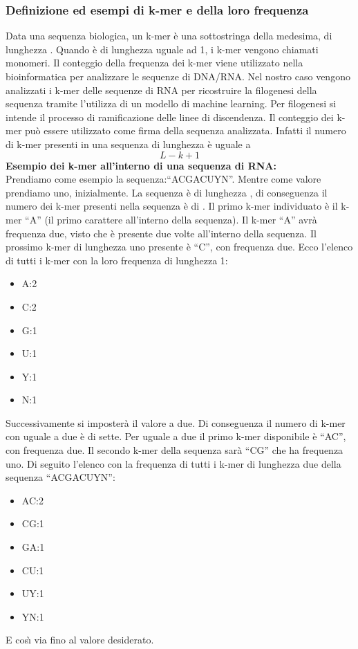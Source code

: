     \subsubsection{Definizione ed esempi di k-mer e della loro frequenza}
    Data una sequenza biologica, un k-mer \`e una sottostringa della medesima, di lunghezza \klenght.
    Quando \klenght \`e di lunghezza uguale ad 1, i k-mer vengono chiamati monomeri.
    Il conteggio della frequenza dei k-mer viene utilizzato nella bioinformatica per analizzare le sequenze di DNA/RNA.
    Nel nostro caso vengono analizzati i k-mer delle sequenze di RNA per ricostruire la filogenesi della sequenza
    tramite l'utilizza di un modello di machine learning.
    Per filogenesi si intende il processo di ramificazione delle linee di discendenza.
    Il conteggio dei k-mer pu\`o essere utilizzato come firma della sequenza analizzata. Infatti
    il numero di k-mer presenti in una sequenza di lunghezza \slenght \`e uguale a
    \begin{equation*}
        L-k+1
    \end{equation*}
    \textbf{Esempio dei k-mer all'interno di una sequenza di RNA:}
    \\
    Prendiamo come esempio la sequenza:``ACGACUYN''.
    Mentre come valore \klenght prendiamo uno, inizialmente.
    La sequenza \`e di lunghezza , di conseguenza il numero dei k-mer presenti nella sequenza \`e di .
    Il primo k-mer individuato \`e il k-mer ``A'' (il primo carattere all'interno della sequenza).
    Il k-mer ``A'' avr\`a frequenza due, visto che \`e presente due volte all'interno della sequenza.
    Il prossimo k-mer di lunghezza uno presente \`e ``C'', con frequenza due.
    Ecco l'elenco di tutti i k-mer con la loro frequenza di lunghezza 1:
    \begin{itemize}
        \item A:2
        \item C:2
        \item G:1
        \item U:1
        \item Y:1
        \item N:1
    \end{itemize}
    Successivamente si imposter\`a il valore \klenght a due.
    Di conseguenza il numero di k-mer con \klenght uguale a due \`e di sette.
    Per \klenght uguale a due il primo k-mer disponibile \`e ``AC'', con frequenza due.
    Il secondo k-mer della sequenza sar\`a ``CG'' che ha frequenza uno.
    Di seguito l'elenco con la frequenza di tutti i k-mer di lunghezza due della sequenza ``ACGACUYN'':
    \begin{itemize}
        \item AC:2
        \item CG:1
        \item GA:1
        \item CU:1
        \item UY:1
        \item YN:1
    \end{itemize}
    E cos\`{\i} via fino al valore \klenght desiderato.